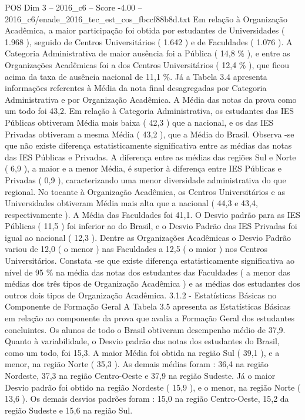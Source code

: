 \begin{textsample}{POS Dim 3 – 2016\_c6 – Score -4.00 – 2016\_c6/enade\_2016\_tec\_est\_cos\_fbccf88b8d.txt}
Em relação à Organização Acadêmica, a maior participação foi obtida por estudantes de Universidades ( 1.968 ), seguido de Centros Universitários ( 1.642 ) e de Faculdades ( 1.076 ).
A Categoria Administrativa de maior ausência foi a Pública ( 14,8 \% ), e entre as Organizações Acadêmicas foi a dos Centros Universitários ( 12,4 \% ), que ficou acima da taxa de ausência nacional de 11,1 \%.
Já a Tabela 3.4 apresenta informações referentes à Média da nota final desagregadas por Categoria Administrativa e por Organização Acadêmica.
A Média das notas da prova como um todo foi 43,2.
Em relação à Categoria Administrativa, os estudantes das IES Públicas obtiveram Média mais baixa ( 42,3 ) que a nacional, e os das IES Privadas obtiveram a mesma Média ( 43,2 ), que a Média do Brasil.
Observa -se que não existe diferença estatisticamente significativa entre as médias das notas das IES Públicas e Privadas.
A diferença entre as médias das regiões Sul e Norte ( 6,9 ), a maior e a menor Média, é superior à diferença entre IES Públicas e Privadas ( 0,9 ), caracterizando uma menor diversidade administrativa do que regional.
No tocante à Organização Acadêmica, os Centros Universitários e as Universidades obtiveram Média mais alta que a nacional ( 44,3 e 43,4, respectivamente ).
A Média das Faculdades foi 41,1.
O Desvio padrão para as IES Públicas ( 11,5 ) foi inferior ao do Brasil, e o Desvio Padrão das IES Privadas foi igual ao nacional ( 12,3 ).
Dentre as Organizações Acadêmicas o Desvio Padrão variou de 12,0 ( o menor ) nas Faculdades a 12,5 ( o maior ) nos Centros Universitários.
Constata -se que existe diferença estatisticamente significativa ao nível de 95 \% na média das notas dos estudantes das Faculdades ( a menor das médias dos três tipos de Organização Acadêmica ) e as médias dos estudantes dos outros dois tipos de Organização Acadêmica. 3.1.2 - Estatísticas Básicas no Componente de Formação Geral A Tabela 3.5 apresenta as Estatísticas Básicas em relação ao componente da prova que avalia a Formação Geral dos estudantes concluintes.
Os alunos de todo o Brasil obtiveram desempenho médio de 37,9.
Quanto à variabilidade, o Desvio padrão das notas dos estudantes do Brasil, como um todo, foi 15,3.
A maior Média foi obtida na região Sul ( 39,1 ), e a menor, na região Norte ( 35,3 ).
As demais médias foram : 36,4 na região Nordeste, 37,3 na região Centro-Oeste e 37,9 na região Sudeste.
Já o maior Desvio padrão foi obtido na região Nordeste ( 15,9 ), e o menor, na região Norte ( 13,6 ).
Os demais desvios padrões foram : 15,0 na região Centro-Oeste, 15,2 da região Sudeste e 15,6 na região Sul.

\end{textsample}
